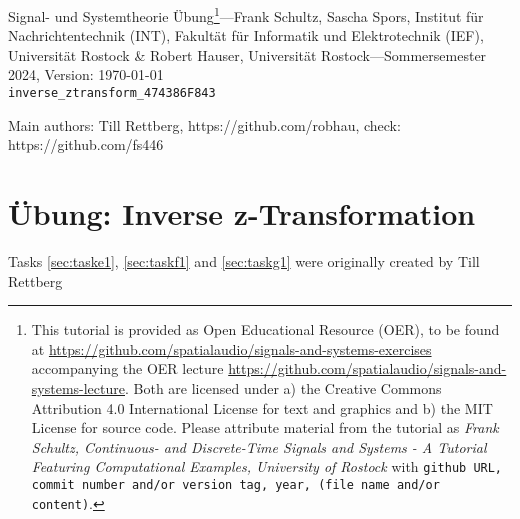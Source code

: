 \documentclass[11pt,a4paper,DIV=12]{scrartcl}
\begin{document}
%
\noindent Signal- und Systemtheorie Übung\footnote{This tutorial is provided as
Open Educational Resource (OER), to be found at
\url{https://github.com/spatialaudio/signals-and-systems-exercises}
accompanying the OER lecture
\url{https://github.com/spatialaudio/signals-and-systems-lecture}.
%
Both are licensed under a) the Creative Commons Attribution 4.0 International
License for text and graphics and b) the MIT License for source code.
%
Please attribute material from the tutorial as \textit{Frank Schultz,
Continuous- and Discrete-Time Signals and Systems - A Tutorial Featuring
Computational Examples, University of Rostock} with
\texttt{github URL, commit number and/or version tag, year, (file name and/or
content)}.}---Frank Schultz, Sascha Spors,
Institut für Nachrichtentechnik (INT),
Fakultät für Informatik und Elektrotechnik (IEF),
Universität Rostock \&
Robert Hauser, Universität Rostock---Sommersemester 2024, Version: \today\\
\verb|inverse_ztransform_474386F843|

\noindent Main authors: Till Rettberg, https://github.com/robhau, check: https://github.com/fs446

\tableofcontents

\section{Übung: Inverse z-Transformation}

Tasks \ref{sec:taske1}, \ref{sec:taskf1} and \ref{sec:taskg1} were originally created by Till Rettberg
\end{document}
